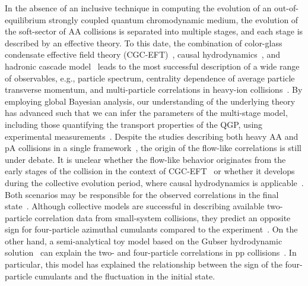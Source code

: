 In the absence of an inclusive technique in computing the evolution of an out-of-equilibrium strongly coupled quantum chromodynamic medium, the evolution of the soft-sector of AA collisions is separated into multiple stages, and each stage is described by an effective theory. To this date, the combination of color-glass condensate effective field theory (CGC-EFT)~\cite{Schenke:2012wb,Schenke:2012hg}, causal hydrodynamics~\cite{Kolb:2003dz,Song:2007ux,Dusling:2007gi,Holopainen:2010gz,Schenke:2010rr,Romatschke:2007mq,Niemi:2015qia,Jeon:2015dfa,Romatschke:2017ejr}, and hadronic cascade model~\cite{Bass:1998ca,Bleicher:1999xi,Weil:2016zrk} leads to the most successful description of a wide range of observables, e.g., particle spectrum, centrality dependence of average particle transverse momentum, and multi-particle correlations in heavy-ion collisions~\cite{ALICE:2016kpq,Acharya:2017gsw,Acharya:2017zfg,Acharya:2020taj,ALICE:2021klf,ALICE:2021adw,ALICE:2013mez,ALICE:2011ab}. By employing global Bayesian analysis, our understanding of the underlying theory has advanced such that we can infer the parameters of the multi-stage model, including those quantifying the transport properties of the QGP, using experimental measurements~\cite{Bernhard:2016tnd,Bernhard:2019bmu,Parkkila:2021tqq,Parkkila:2021yha}. Despite the studies describing both heavy AA and pA collisions in a single framework~\cite{Moreland:2018gsh}, the origin of the flow-like correlations is still under debate. It is unclear whether the flow-like behavior originates from the early stages of the collision in the context of CGC-EFT~\cite{Dusling:2012cg,Bzdak:2013zma} or whether it develops during the collective evolution period, where causal hydrodynamics is applicable~\cite{Greif:2017bnr,Mantysaari:2017cni}. Both scenarios may be responsible for the observed correlations in the final state~\cite{Greif:2017bnr}. Although collective models are successful in describing available two-particle correlation data from small-system collisions, they predict an opposite sign for four-particle azimuthal cumulants compared to the experiment~\cite{Khachatryan:2016txc,ATLAS:2017rtr,Zhao:2017rgg}. On the other hand, a semi-analytical toy model based on the Gubser hydrodynamic solution~\cite{Gubser:2010ze,Gubser:2010ui} can explain the two- and four-particle correlations in pp collisions~\cite{Taghavi:2019mqz}. In particular, this model has explained the relationship between the sign of the four-particle cumulants and the fluctuation in the initial state. 

